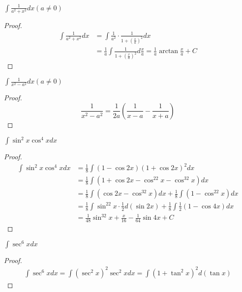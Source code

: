 \documentclass[11pt]{article}
\begin{document}
\begin{proposition}[]
\(\int\frac{1}{a^2+x^2}dx(a\neq0)\)
\end{proposition}

\begin{proof}
\begin{align*}
\int\frac{1}{a^2+x^2}dx&=\int\frac{1}{a^2}\cdot\frac{1}{1+(\frac{x}{a})^2}dx\\
&=\frac{1}{a}\int\frac{1}{1+(\frac{x}{a})^2}d\frac{x}{a}=\frac{1}{a}\arctan\frac{x}{a}+C
\end{align*}
\end{proof}

\begin{proposition}[]
\(\int\frac{1}{x^2-a^2}dx(a\neq0)\)
\end{proposition}

\begin{proof}
\begin{equation*}
\frac{1}{x^2-a^2}=\frac{1}{2a}(\frac{1}{x-a}-\frac{1}{x+a})
\end{equation*}
\end{proof}

\begin{proposition}[]
\(\int\sin^2x\cos^4xdx\)
\end{proposition}

\begin{proof}
\begin{align*}
\int\sin^2x\cos^4xdx&=\frac{1}{8}\int(1-\cos2x)(1+\cos2x)^2dx\\
&=\frac{1}{8}\int(1+\cos2x-\cos^22x-\cos^32x)dx\\
&=\frac{1}{8}\int(\cos2x-\cos^32x)dx+\frac{1}{8}\int(1-\cos^22x)dx\\
&=\frac{1}{8}\int\sin^22x\cdot\frac{1}{2}d(\sin2x)+\frac{1}{8}\int\frac{1}{2}(1-\cos4x)dx\\
&=\frac{1}{48}\sin^32x+\frac{x}{16}-\frac{1}{64}\sin4x+C
\end{align*}
\end{proof}

\begin{proposition}[]
\(\int\sec^6xdx\)
\end{proposition}

\begin{proof}
\begin{align*}
\int\sec^6xdx=\int(\sec^2x)^2\sec^2xdx=\int(1+\tan^2x)^2d(\tan x)
\end{align*}
\end{proof}
\end{document}
